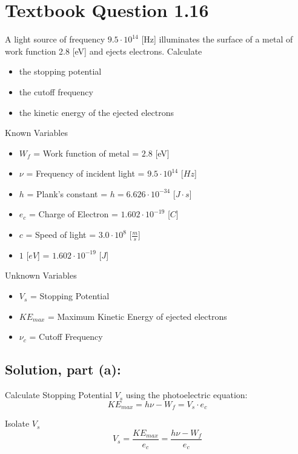 \documentclass[12pt]{article}
\begin{document}
\section{Textbook Question 1.16}
    A light source of frequency $9.5 \cdot 10^{14}$ [Hz] illuminates the surface of a metal of work function 2.8 [eV] and ejects electrons. Calculate
    \begin{itemize}
        \item [(a)] the stopping potential
        \item [(b)] the cutoff frequency
        \item [(c)] the kinetic energy of the ejected electrons
    \end{itemize}

    Known Variables
    \begin{itemize}
        \item $W_f$ = Work function of metal = $2.8$ [eV]
        \item $\nu$ = Frequency of incident light = $9.5 \cdot 10^14$ [$Hz$]
        \item $h$ = Plank's constant = $h = 6.626 \cdot 10^{-34}$ [$J \cdot s$]
        \item $e_c$ = Charge of Electron = $1.602 \cdot 10^{-19}$ [$C$]
        \item $c$ = Speed of light = $3.0 \cdot 10^8$ [$\frac{m}{s}$]
        \item $1$ [$eV$] = $1.602 \cdot 10^{-19}$ [$J$]
    \end{itemize}

    Unknown Variables
    \begin{itemize}
        \item $V_s$ = Stopping Potential
        \item $KE_{max}$ = Maximum Kinetic Energy of ejected electrons
        \item $\nu_c$ = Cutoff Frequency
    \end{itemize}
    
    \subsection{Solution, part (a):}  
        Calculate Stopping Potential $V_s$ using the photoelectric equation:
        \begin{equation}
            KE_{max} = h \nu - W_f = V_s \cdot e_c
        \end{equation}

        Isolate $V_s$
        \begin{equation}
            V_s = \frac{KE_{max}}{e_c} = \frac{h \nu - W_f}{e_c}
        \end{equation}
\end{document}

